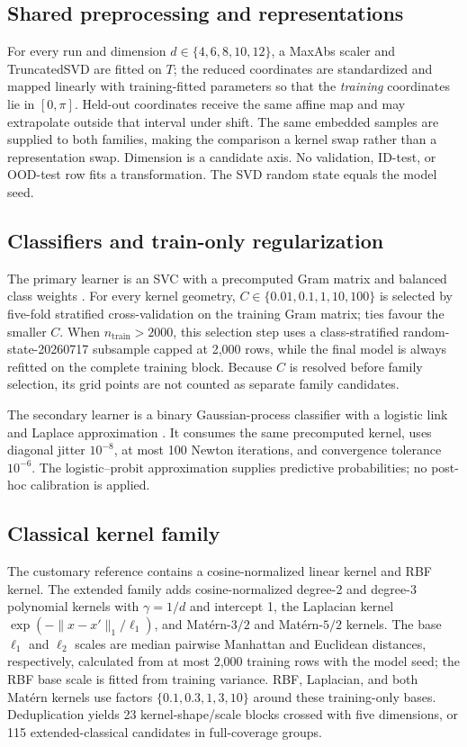 \documentclass[referee,lineno,pdflatex,sn-nature]{sn-jnl}
\theoremstyle{thmstyleone}%
\theoremstyle{thmstyletwo}%
\theoremstyle{thmstylethree}%
\begin{document}
\subsection{Shared preprocessing and representations}

For every run and dimension $d\in\{4,6,8,10,12\}$, a MaxAbs scaler and TruncatedSVD are fitted on $T$; the reduced coordinates are standardized and mapped linearly with training-fitted parameters so that the \emph{training} coordinates lie in $[0,\pi]$. Held-out coordinates receive the same affine map and may extrapolate outside that interval under shift. The same embedded samples are supplied to both families, making the comparison a kernel swap rather than a representation swap. Dimension is a candidate axis. No validation, ID-test, or OOD-test row fits a transformation. The SVD random state equals the model seed.

\subsection{Classifiers and train-only regularization}

The primary learner is an SVC with a precomputed Gram matrix and balanced class weights \cite{cortes1995svm}. For every kernel geometry, $C\in\{0.01,0.1,1,10,100\}$ is selected by five-fold stratified cross-validation on the training Gram matrix; ties favour the smaller $C$. When $n_{\mathrm{train}}>2000$, this selection step uses a class-stratified random-state-20260717 subsample capped at 2,000 rows, while the final model is always refitted on the complete training block. Because $C$ is resolved before family selection, its grid points are not counted as separate family candidates.

The secondary learner is a binary Gaussian-process classifier with a logistic link and Laplace approximation \cite{rasmussen2006gpml}. It consumes the same precomputed kernel, uses diagonal jitter $10^{-8}$, at most 100 Newton iterations, and convergence tolerance $10^{-6}$. The logistic--probit approximation supplies predictive probabilities; no post-hoc calibration is applied.

\subsection{Classical kernel family}

The customary reference contains a cosine-normalized linear kernel and RBF kernel. The extended family adds cosine-normalized degree-2 and degree-3 polynomial kernels with $\gamma=1/d$ and intercept 1, the Laplacian kernel $\exp(-\|x-x'\|_1/\ell_1)$, and Mat\'ern-$3/2$ and Mat\'ern-$5/2$ kernels. The base $\ell_1$ and $\ell_2$ scales are median pairwise Manhattan and Euclidean distances, respectively, calculated from at most 2,000 training rows with the model seed; the RBF base scale is fitted from training variance. RBF, Laplacian, and both Mat\'ern kernels use factors $\{0.1,0.3,1,3,10\}$ around these training-only bases. Deduplication yields 23 kernel-shape/scale blocks crossed with five dimensions, or 115 extended-classical candidates in full-coverage groups.
\end{document}
